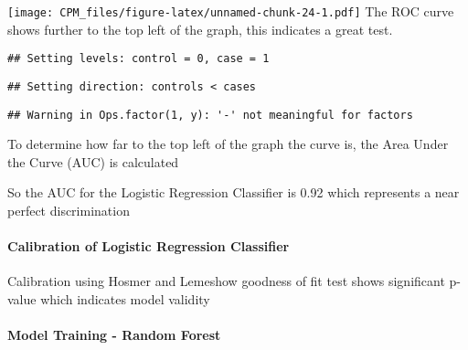 \documentclass[]{article}
\newenvironment{Shaded}{\begin{snugshade}}{\end{snugshade}}
\newcommand{\DataTypeTok}[1]{\textcolor[rgb]{0.13,0.29,0.53}{#1}}
\newcommand{\DecValTok}[1]{\textcolor[rgb]{0.00,0.00,0.81}{#1}}
\newcommand{\KeywordTok}[1]{\textcolor[rgb]{0.13,0.29,0.53}{\textbf{#1}}}
\newcommand{\NormalTok}[1]{#1}
\newcommand{\OperatorTok}[1]{\textcolor[rgb]{0.81,0.36,0.00}{\textbf{#1}}}
\newcommand{\StringTok}[1]{\textcolor[rgb]{0.31,0.60,0.02}{#1}}
\let\oldparagraph\paragraph
\renewcommand{\paragraph}[1]{\oldparagraph{#1}\mbox{}}
\begin{document}
\texttt{[image: CPM\_files/figure-latex/unnamed-chunk-24-1.pdf]} The ROC
curve shows further to the top left of the graph, this indicates a great
test.

\begin{Shaded}
\end{Shaded}

\begin{verbatim}
## Setting levels: control = 0, case = 1
\end{verbatim}

\begin{verbatim}
## Setting direction: controls < cases
\end{verbatim}

\begin{Shaded}
\end{Shaded}

\begin{verbatim}
## Warning in Ops.factor(1, y): '-' not meaningful for factors
\end{verbatim}

To determine how far to the top left of the graph the curve is, the Area
Under the Curve (AUC) is calculated

So the AUC for the Logistic Regression Classifier is 0.92 which
represents a near perfect discrimination

\hypertarget{calibration-of-logistic-regression-classifier}{%
\paragraph{Calibration of Logistic Regression
Classifier}\label{calibration-of-logistic-regression-classifier}}

Calibration using Hosmer and Lemeshow goodness of fit test shows
significant p-value which indicates model validity

\hypertarget{model-training---random-forest}{%
\paragraph{Model Training - Random
Forest}\label{model-training---random-forest}}
\end{document}
